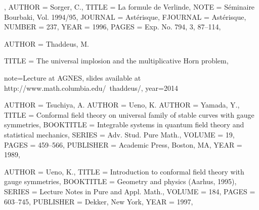 \begin{bibdiv}
\begin{biblist}

{} {,
    AUTHOR = {Sorger, C.},
     TITLE = {La formule de {V}erlinde},
      NOTE = {S\'{e}minaire Bourbaki, Vol. 1994/95},
   JOURNAL = {Ast\'{e}risque},
  FJOURNAL = {Ast\'{e}risque},
    NUMBER = {237},
      YEAR = {1996},
     PAGES = {Exp. No. 794, 3, 87--114},
}
 {
     AUTHOR = {Thaddeus, M.}

     TITLE = {The universal implosion
and the multiplicative Horn problem},

		note={Lecture at AGNES, slides available at http://www.math.columbia.edu/~thaddeus/},
		year={2014}


}

 {
    AUTHOR = {Tsuchiya, A.}
    AUTHOR = {Ueno, K.}
    AUTHOR = {Yamada, Y.},
     TITLE = {Conformal field theory on universal family of stable curves
              with gauge symmetries},
 BOOKTITLE = {Integrable systems in quantum field theory and statistical
              mechanics},
    SERIES = {Adv. Stud. Pure Math.},
    VOLUME = {19},
     PAGES = {459--566},
 PUBLISHER = {Academic Press, Boston, MA},
      YEAR = {1989},
}

 {
    AUTHOR = {Ueno, K.},
     TITLE = {Introduction to conformal field theory with gauge symmetries},
 BOOKTITLE = {Geometry and physics ({A}arhus, 1995)},
    SERIES = {Lecture Notes in Pure and Appl. Math.},
    VOLUME = {184},
     PAGES = {603--745},
 PUBLISHER = {Dekker, New York},
      YEAR = {1997},
}


\end{biblist}
\end{bibdiv}
